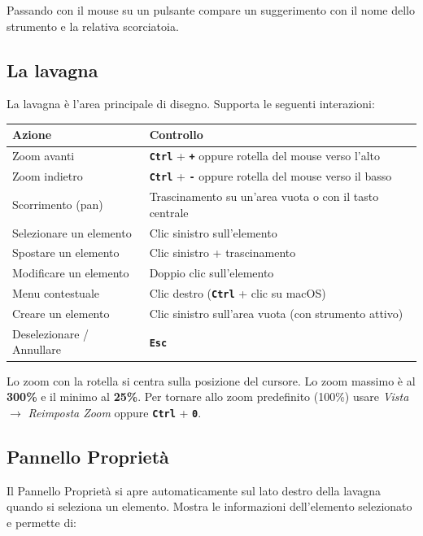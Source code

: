 \documentclass[a4paper,11pt]{article}
\newcommand{\key}[1]{\texttt{\textbf{#1}}}
\newcommand{\menu}[1]{\textit{#1}}
\begin{document}
Passando con il mouse su un pulsante compare un suggerimento con il nome dello strumento e la
relativa scorciatoia.

\subsection{La lavagna}

La lavagna è l'area principale di disegno. Supporta le seguenti interazioni:

\begin{center}
\begin{tabular}{@{}ll@{}}
  \toprule
  \textbf{Azione} & \textbf{Controllo} \\
  \midrule
  Zoom avanti & \key{Ctrl} + \key{+} oppure rotella del mouse verso l'alto \\
  Zoom indietro & \key{Ctrl} + \key{-} oppure rotella del mouse verso il basso \\
  Scorrimento (pan) & Trascinamento su un'area vuota o con il tasto centrale \\
  Selezionare un elemento & Clic sinistro sull'elemento \\
  Spostare un elemento & Clic sinistro + trascinamento \\
  Modificare un elemento & Doppio clic sull'elemento \\
  Menu contestuale & Clic destro (\key{Ctrl} + clic su macOS) \\
  Creare un elemento & Clic sinistro sull'area vuota (con strumento attivo) \\
  Deselezionare / Annullare & \key{Esc} \\
  \bottomrule
\end{tabular}
\end{center}

\begin{tcolorbox}[tipbox, title={Suggerimento}]
  Lo zoom con la rotella si centra sulla posizione del cursore. Lo zoom massimo è al
  \textbf{300\%} e il minimo al \textbf{25\%}. Per tornare allo zoom predefinito (100\%) usare
  \menu{Vista} $\to$ \menu{Reimposta Zoom} oppure \key{Ctrl} + \key{0}.
\end{tcolorbox}

\subsection{Pannello Proprietà}

Il Pannello Proprietà si apre automaticamente sul lato destro della lavagna quando si seleziona
un elemento. Mostra le informazioni dell'elemento selezionato e permette di:
\end{document}
